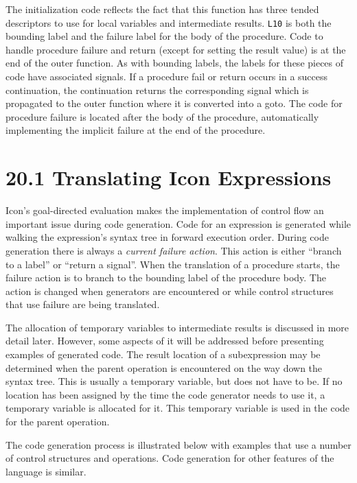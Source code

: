 \noindent
The initialization code reflects the fact that this function has three
tended descriptors to use for local variables and intermediate
results. \texttt{L10} is both the bounding label and the failure label for the
body of the procedure. Code to handle procedure failure and return
(except for setting the result value) is at the end of the outer
function. As with bounding labels, the labels for these pieces of code
have associated signals. If a procedure fail or return occurs in a
success continuation, the continuation returns the corresponding
signal which is propagated to the outer function where it is converted
into a goto. The code for procedure failure is located after the body
of the procedure, automatically implementing the implicit failure at
the end of the procedure.


\section[20.1 Translating Icon Expressions]{20.1 Translating Icon Expressions}

Icon's goal-directed evaluation makes the implementation of control
flow an important issue during code generation. Code for an expression
is generated while walking the expression's syntax tree in forward
execution order. During code generation there is always a
\textit{current failure action}. This action is either ``branch to a
label'' or ``return a signal''.  When the translation of a procedure
starts, the failure action is to branch to the bounding label of the
procedure body. The action is changed when generators are encountered
or while control structures that use failure are being translated.

The allocation of temporary variables to intermediate results is
discussed in more detail later. However, some aspects of it will be
addressed before presenting examples of generated code. The result
location of a subexpression may be determined when the parent
operation is encountered on the way down the syntax tree. This is
usually a temporary variable, but does not have to be. If no location
has been assigned by the time the code generator needs to use it, a
temporary variable is allocated for it. This temporary variable is
used in the code for the parent operation.

The code generation process is illustrated below with examples that
use a number of control structures and operations.  Code generation
for other features of the language is similar.

